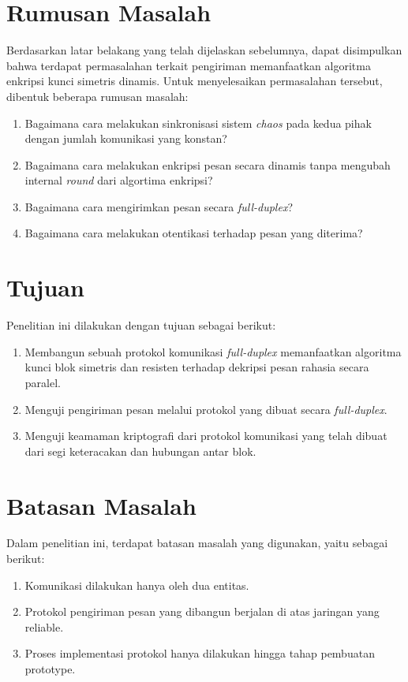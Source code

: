 \section{Rumusan Masalah}
Berdasarkan latar belakang yang telah dijelaskan sebelumnya, dapat disimpulkan bahwa terdapat permasalahan terkait pengiriman memanfaatkan algoritma enkripsi kunci simetris dinamis. Untuk menyelesaikan permasalahan tersebut, dibentuk beberapa rumusan masalah:
\begin{enumerate}
  \item Bagaimana cara melakukan sinkronisasi sistem \emph{chaos} pada kedua pihak dengan jumlah komunikasi yang konstan?
  \item Bagaimana cara melakukan enkripsi pesan secara dinamis tanpa mengubah internal \emph{round} dari algortima enkripsi?
  \item Bagaimana cara mengirimkan pesan secara \emph{full-duplex}?
  \item Bagaimana cara melakukan otentikasi terhadap pesan yang diterima?
\end{enumerate}

\section{Tujuan}
Penelitian ini dilakukan dengan tujuan sebagai berikut:

\begin{enumerate}
  \item Membangun sebuah protokol komunikasi \emph{full-duplex} memanfaatkan algoritma kunci blok simetris dan resisten terhadap dekripsi pesan rahasia secara paralel.
  \item Menguji pengiriman pesan melalui protokol yang dibuat secara \emph{full-duplex}.
  \item Menguji keamaman kriptografi dari protokol komunikasi yang telah dibuat dari segi keteracakan dan hubungan antar blok.
\end{enumerate}

\section{Batasan Masalah}
Dalam penelitian ini, terdapat batasan masalah yang digunakan, yaitu sebagai berikut:
\begin{enumerate}
  \item Komunikasi dilakukan hanya oleh dua entitas.
  \item Protokol pengiriman pesan yang dibangun berjalan di atas jaringan yang reliable.
  \item Proses implementasi protokol hanya dilakukan hingga tahap pembuatan prototype.
\end{enumerate}

